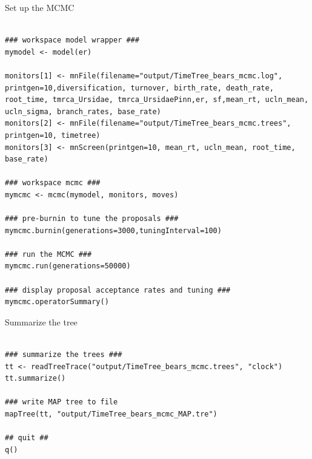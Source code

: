 Set up the MCMC
{\tt \begin{snugshade*}
\begin{lstlisting}

### workspace model wrapper ###
mymodel <- model(er)

monitors[1] <- mnFile(filename="output/TimeTree_bears_mcmc.log", printgen=10,diversification, turnover, birth_rate, death_rate, root_time, tmrca_Ursidae, tmrca_UrsidaePinn,er, sf,mean_rt, ucln_mean, ucln_sigma, branch_rates, base_rate)
monitors[2] <- mnFile(filename="output/TimeTree_bears_mcmc.trees", printgen=10, timetree)
monitors[3] <- mnScreen(printgen=10, mean_rt, ucln_mean, root_time, base_rate)

### workspace mcmc ###
mymcmc <- mcmc(mymodel, monitors, moves)

### pre-burnin to tune the proposals ###
mymcmc.burnin(generations=3000,tuningInterval=100)

### run the MCMC ###
mymcmc.run(generations=50000)

### display proposal acceptance rates and tuning ###
mymcmc.operatorSummary()

\end{lstlisting}
\end{snugshade*}}

Summarize the tree
{\tt \begin{snugshade*}
\begin{lstlisting}

### summarize the trees ###
tt <- readTreeTrace("output/TimeTree_bears_mcmc.trees", "clock")
tt.summarize()

### write MAP tree to file
mapTree(tt, "output/TimeTree_bears_mcmc_MAP.tre")

## quit ##
q()
\end{lstlisting}
\end{snugshade*}}

